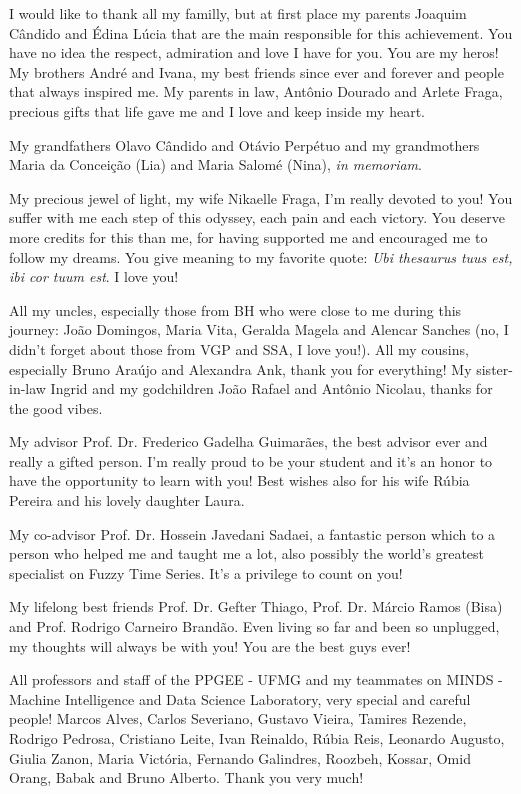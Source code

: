 \begin{agradecimentos}
I would like to thank all my familly, but at first place my parents Joaquim Cândido and Édina Lúcia that are the main responsible for this achievement.  You have no idea the respect, admiration and love I have for you. You are my heros! My brothers André and Ivana, my best friends since ever and forever and people that always inspired me. My parents in law, Antônio Dourado and Arlete Fraga, precious gifts that life gave me and I love and keep inside my heart. 

My grandfathers Olavo Cândido and Otávio Perpétuo and my grandmothers Maria da Conceição (Lia) and Maria Salomé (Nina), \textit{in memoriam}.

My precious jewel of light, my wife Nikaelle Fraga, I'm really devoted to you! You suffer with me each step of this odyssey, each pain and each victory. You deserve more credits for this than me, for having supported me and encouraged me to follow my dreams. You give meaning to my favorite quote: \textit{Ubi thesaurus tuus est, ibi cor tuum est}. I love you!

 All my uncles, especially those from BH who were close to me during this journey: João Domingos, Maria Vita, Geralda Magela and Alencar Sanches (no, I didn't forget about those from VGP and SSA, I love you!). All my cousins, especially Bruno Araújo and Alexandra Ank, thank you for everything! My sister-in-law Ingrid and my godchildren João Rafael and Antônio Nicolau, thanks for the good vibes. 

My advisor Prof. Dr. Frederico Gadelha Guimarães, the best advisor ever and really a gifted person. I'm really proud to be your student and it's an honor to have the opportunity to learn with you! Best wishes also for his wife Rúbia Pereira and his lovely daughter Laura.

My co-advisor Prof. Dr. Hossein Javedani Sadaei, a fantastic person which to a person who helped me and taught me a lot, also possibly the world's greatest specialist on Fuzzy Time Series. It's a privilege to count on you!

My lifelong best friends Prof. Dr. Gefter Thiago, Prof. Dr. Márcio Ramos (Bisa) and Prof. Rodrigo Carneiro Brandão. Even living so far and been so unplugged, my thoughts will always be with you! You are the best guys ever! 

All professors and staff of the PPGEE - UFMG and my teammates on MINDS - Machine Intelligence and Data Science Laboratory, very special and careful people! Marcos Alves, Carlos Severiano, Gustavo Vieira, Tamires Rezende, Rodrigo Pedrosa, Cristiano Leite, Ivan Reinaldo, Rúbia Reis, Leonardo Augusto,  Giulia Zanon, Maria Victória, Fernando Galindres, Roozbeh, Kossar, Omid Orang, Babak and Bruno Alberto. Thank you very much!  


\end{agradecimentos}
